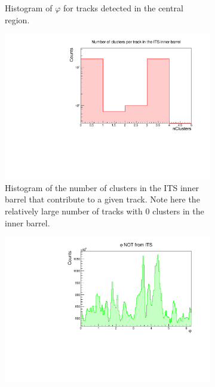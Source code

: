 \begin{figure}[h]
\begin{subfigure}[t]{.49\linewidth}
        \caption{Histogram of $\varphi$ for tracks detected in the central region.}
        \label{fig:nohasITS_phi}
    \end{subfigure}
    \begin{subfigure}[t]{.49\linewidth}
        \centering
        \includegraphics[width=\linewidth]{Plots/pass4_TracksIU_nohasITS/itsNClsInnerBarrel.pdf}
        \caption{Histogram of the number of clusters in the ITS inner barrel that contribute to a given track. Note here the relatively large number of tracks with 0 clusters in the inner barrel.}
        \label{fig:nohasITS_NCls_InnerBarrel}
    \end{subfigure}
    \hfill 
    \begin{subfigure}[t]{.49\linewidth}
        \centering
        \includegraphics[width=\linewidth]{Plots/phi_no_ITS.pdf}

\end{subfigure}
\end{figure}

